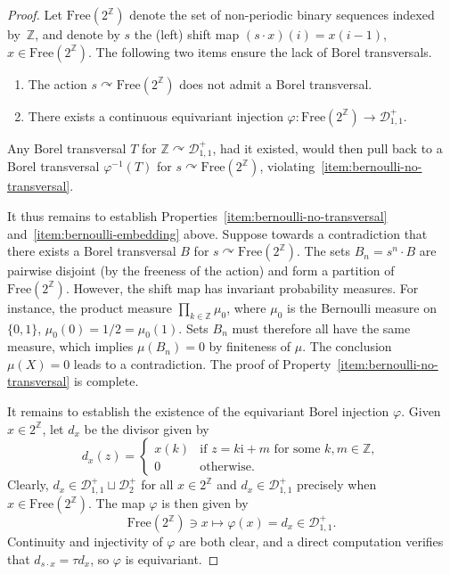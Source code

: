 \documentclass[12pt]{paper}
\numberwithin{equation}{section}
\theoremstyle{plain}
\theoremstyle{definition}
\newcommand{\Z}{\mathbb{Z}}
\newcommand{\im}{\mathrm{i}} %
\newcommand{\divis}[1][]{\mathcal{D}_{#1}}
\newcommand{\divisp}[1][]{\divis[#1]^{+}}
\newcommand{\acts}{\curvearrowright}
\newcommand{\free}{\mathrm{Free}}
\renewcommand{\phi}{\varphi}
\begin{document}
\begin{proof}
  Let \(\mathrm{Free}(2^{\Z})\) denote the set of non-periodic binary sequences indexed by~\(\Z\),
  and denote by \(s\) the (left) shift map \((s\cdot x)(i) = x(i-1)\), \(x\in\free(2^\Z)\).  The
  following two items ensure the lack of Borel transversals.
  \begin{enumerate}[leftmargin=1cm, label={\sf \arabic*}., ref={\sf \arabic*}]
  \item\label{item:bernoulli-no-transversal} The action \(s\acts \free(2^{\Z})\) does not admit a
    Borel transversal.
  \item\label{item:bernoulli-embedding} There exists a continuous equivariant injection
    \(\varphi:\mathrm{Free}(2^{\Z})\to \divisp[1,1]\).
  \end{enumerate}
  Any Borel transversal \(T\) for \(\Z \acts \divisp[1,1]\), had it existed, would then pull back to
  a Borel transversal \(\phi^{-1}(T)\) for \(s \acts \free(2^{\Z})\),
  violating~\eqref{item:bernoulli-no-transversal}.

  It thus remains to establish Properties~\eqref{item:bernoulli-no-transversal}
  and~\eqref{item:bernoulli-embedding} above.  Suppose towards a contradiction that there exists a
  Borel transversal \(B\) for \(s \acts \free(2^{\Z})\).  The sets \(B_{n} = s^{n} \cdot B\) are
  pairwise disjoint (by the freeness of the action) and form a partition of \(\free(2^{\Z})\).
  However, the shift map has invariant probability measures.  For instance, the product measure
  \(\prod_{k \in \Z}\mu_{0}\), where \(\mu_{0}\) is the Bernoulli measure on \(\{0,1\}\),
  \(\mu_{0}(0) = 1/2 = \mu_{0}(1)\).  Sets \(B_{n}\) must therefore all have the same measure, which
  implies \(\mu(B_{n}) = 0\) by finiteness of \(\mu\).  The conclusion \(\mu(X) = 0\) leads to a
  contradiction.  The proof of Property~\eqref{item:bernoulli-no-transversal} is complete.


  It remains to establish the existence of the equivariant Borel injection \(\varphi\). Given
  \(x \in 2^{\Z}\), let \(d_{x}\) be the divisor given by
  \begin{displaymath}
    d_{x}(z) =
    \begin{cases}
      x(k) & \textrm{if \(z = k\im + m\) for some \(k,m \in \Z\)}, \\
      0    & \textrm{otherwise}.
    \end{cases}
  \end{displaymath}
  Clearly, \(d_{x} \in \divisp[1,1] \sqcup \divisp[2]\) for all \(x \in 2^{\Z}\) and
  \(d_{x} \in \divisp[1,1]\) precisely when \(x \in \free(2^{\Z})\).  The map \(\phi\) is then given
  by
  \[
    \mathrm{Free}(2^{\Z}) \ni x \mapsto \varphi(x)=d_{x} \in \divisp[1,1].
  \]
  Continuity and injectivity of \(\varphi\) are both clear, and a direct computation verifies that
  \(d_{s\cdot x}=\tau d_x\), so \(\varphi\) is equivariant.
\end{proof}
\end{document}
